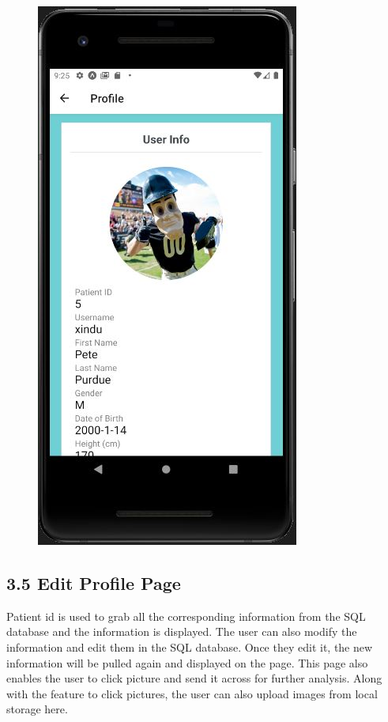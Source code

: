 \documentclass[]{book}
\begin{document}
\begin{figure}
\centering
\includegraphics{./phone_app_doc_images/user_profile_page.JPG}
\caption{}
\end{figure}

\subsection{3.5 Edit Profile Page}\label{edit-profile-page}

Patient id is used to grab all the corresponding information from the
SQL database and the information is displayed. The user can also modify
the information and edit them in the SQL database. Once they edit it,
the new information will be pulled again and displayed on the page. This
page also enables the user to click picture and send it across for
further analysis. Along with the feature to click pictures, the user can
also upload images from local storage here.
\end{document}
